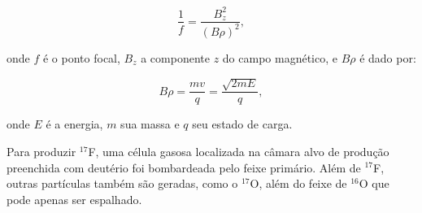 \documentclass[a4paper,12pt,oneside]{book}
\begin{document}
\begin{equation}
    \frac{1}{f} = \frac{B_z ^2}{(B\rho)^2},
\end{equation}

onde $f$ é o ponto focal, $B_z$ a componente $z$ do campo magnético, e $B\rho$ é dado por:

\begin{equation}
    B\rho = \frac{mv}{q} = \frac{\sqrt{2mE}}{q},
\end{equation}

onde $E$ é a energia, $m$ sua massa e $q$ seu estado de carga.



\par Para produzir $^{17}$F, uma célula gasosa localizada na câmara alvo de produção\cite{twinsol} preenchida com deutério foi bombardeada pelo feixe primário. Além de $^{17}$F, outras partículas também são geradas, como o $^{17}$O, além do feixe de $^{16}$O que pode apenas ser espalhado.

\end{document}
